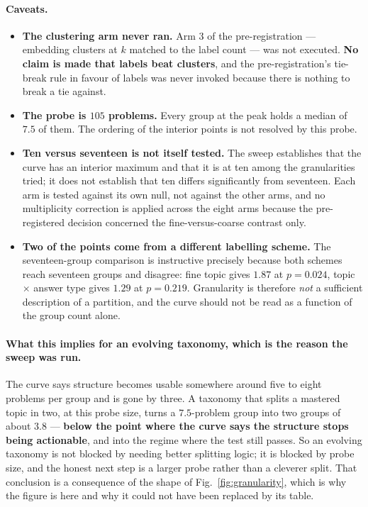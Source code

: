 \paragraph{Caveats.}
\begin{itemize}
\item \textbf{The clustering arm never ran.} Arm 3 of the pre-registration --- embedding
clusters at $k$ matched to the label count --- was not executed. \textbf{No claim is made that
labels beat clusters}, and the pre-registration's tie-break rule in favour of labels was never
invoked because there is nothing to break a tie against.
\item \textbf{The probe is $105$ problems.} Every group at the peak holds a median of $7.5$ of
them. The ordering of the interior points is not resolved by this probe.
\item \textbf{Ten versus seventeen is not itself tested.} The sweep establishes that the curve
has an interior maximum and that it is at ten among the granularities tried; it does not
establish that ten differs significantly from seventeen. Each arm is tested against its own
null, not against the other arms, and no multiplicity correction is applied across the eight
arms because the pre-registered decision concerned the fine-versus-coarse contrast only.
\item \textbf{Two of the points come from a different labelling scheme.} The seventeen-group
comparison is instructive precisely because both schemes reach seventeen groups and disagree:
fine topic gives $1.87$ at $p=0.024$, topic $\times$ answer type gives $1.29$ at $p=0.219$.
Granularity is therefore \emph{not} a sufficient description of a partition, and the curve
should not be read as a function of the group count alone.
\end{itemize}

\paragraph{What this implies for an evolving taxonomy, which is the reason the sweep was run.}
The curve says structure becomes usable somewhere around five to eight problems per group and
is gone by three. A taxonomy that splits a mastered topic in two, at this probe size, turns a
$7.5$-problem group into two groups of about $3.8$ --- \textbf{below the point where the curve
says the structure stops being actionable}, and into the regime where the test still passes.
So an evolving taxonomy is not blocked by needing better splitting logic; it is blocked by
probe size, and the honest next step is a larger probe rather than a cleverer split. That
conclusion is a consequence of the shape of Fig.~\ref{fig:granularity}, which is why the figure
is here and why it could not have been replaced by its table.

